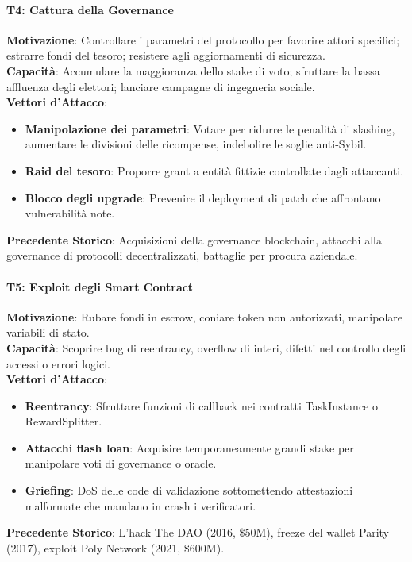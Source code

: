 \documentclass[11pt]{article}
\begin{document}
\begin{itemize}[noitemsep]
\paragraph{T4: Cattura della Governance}
\textbf{Motivazione}: Controllare i parametri del protocollo per favorire attori specifici; estrarre fondi del tesoro; resistere agli aggiornamenti di sicurezza.\\
\textbf{Capacità}: Accumulare la maggioranza dello stake di voto; sfruttare la bassa affluenza degli elettori; lanciare campagne di ingegneria sociale.\\
\textbf{Vettori d'Attacco}:
\begin{itemize}[noitemsep]
  \item \textbf{Manipolazione dei parametri}: Votare per ridurre le penalità di slashing, aumentare le divisioni delle ricompense, indebolire le soglie anti-Sybil.
  \item \textbf{Raid del tesoro}: Proporre grant a entità fittizie controllate dagli attaccanti.
  \item \textbf{Blocco degli upgrade}: Prevenire il deployment di patch che affrontano vulnerabilità note.
\end{itemize}
\textbf{Precedente Storico}: Acquisizioni della governance blockchain, attacchi alla governance di protocolli decentralizzati, battaglie per procura aziendale.

\paragraph{T5: Exploit degli Smart Contract}
\textbf{Motivazione}: Rubare fondi in escrow, coniare token non autorizzati, manipolare variabili di stato.\\
\textbf{Capacità}: Scoprire bug di reentrancy, overflow di interi, difetti nel controllo degli accessi o errori logici.\\
\textbf{Vettori d'Attacco}:
\begin{itemize}[noitemsep]
  \item \textbf{Reentrancy}: Sfruttare funzioni di callback nei contratti TaskInstance o RewardSplitter.
  \item \textbf{Attacchi flash loan}: Acquisire temporaneamente grandi stake per manipolare voti di governance o oracle.
  \item \textbf{Griefing}: DoS delle code di validazione sottomettendo attestazioni malformate che mandano in crash i verificatori.
\end{itemize}
\textbf{Precedente Storico}: L'hack The DAO (2016, \$50M), freeze del wallet Parity (2017), exploit Poly Network (2021, \$600M).


\end{itemize}
\end{document}
